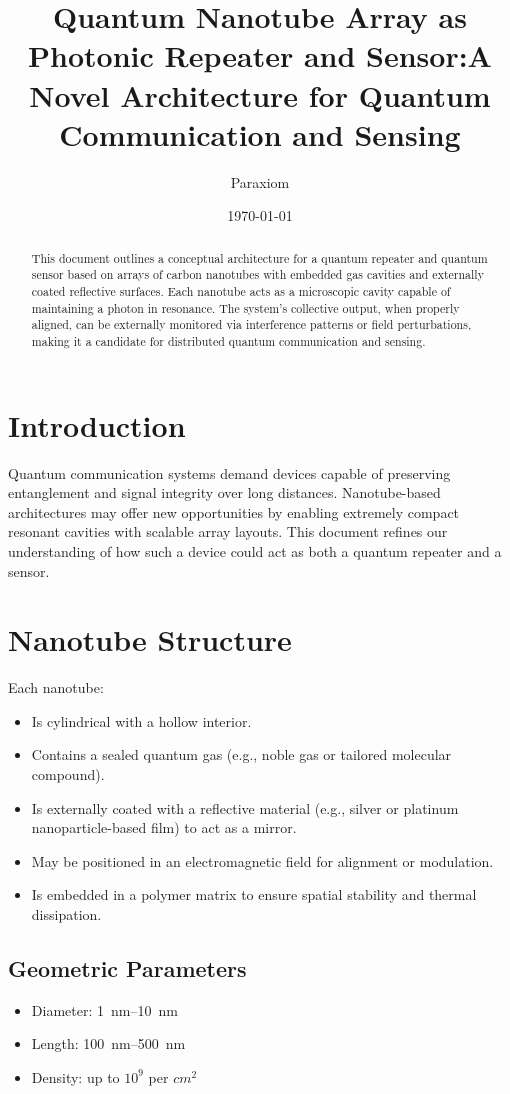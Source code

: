 \documentclass[11pt]{article}
\title{Quantum Nanotube Array as Photonic Repeater and Sensor:\newline A Novel Architecture for Quantum Communication and Sensing}
\author{Paraxiom}
\date{\today}
\begin{document}
	
	\maketitle
	
	\begin{abstract}
		This document outlines a conceptual architecture for a quantum repeater and quantum sensor based on arrays of carbon nanotubes with embedded gas cavities and externally coated reflective surfaces. Each nanotube acts as a microscopic cavity capable of maintaining a photon in resonance. The system's collective output, when properly aligned, can be externally monitored via interference patterns or field perturbations, making it a candidate for distributed quantum communication and sensing.
	\end{abstract}
	
	\section{Introduction}
	Quantum communication systems demand devices capable of preserving entanglement and signal integrity over long distances. Nanotube-based architectures may offer new opportunities by enabling extremely compact resonant cavities with scalable array layouts. This document refines our understanding of how such a device could act as both a quantum repeater and a sensor.
	
	\section{Nanotube Structure}
	Each nanotube:
	\begin{itemize}
		\item Is cylindrical with a hollow interior.
		\item Contains a sealed quantum gas (e.g., noble gas or tailored molecular compound).
		\item Is externally coated with a reflective material (e.g., silver or platinum nanoparticle-based film) to act as a mirror.
		\item May be positioned in an electromagnetic field for alignment or modulation.
		\item Is embedded in a polymer matrix to ensure spatial stability and thermal dissipation.
	\end{itemize}
	
	\subsection{Geometric Parameters}
	\begin{itemize}
		\item Diameter: \SIrange{1}{10}{\nano\meter}
		\item Length: \SIrange{100}{500}{\nano\meter}
		\item Density: up to $10^9$ per $\si{cm^2}$
	\end{itemize}
	
\end{document}
